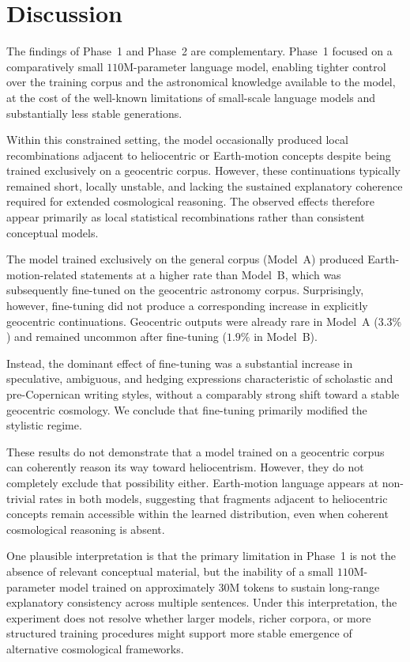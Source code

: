 \section{Discussion}

The findings of Phase~1 and Phase~2 are complementary. Phase~1 focused on a comparatively small $110$M-parameter language model, enabling tighter control over the training corpus and the astronomical knowledge available to the model, at the cost of the well-known limitations of small-scale language models and substantially less stable generations.

Within this constrained setting, the model occasionally produced local recombinations adjacent to heliocentric or Earth-motion concepts despite being trained exclusively on a geocentric corpus. However, these continuations typically remained short, locally unstable, and lacking the sustained explanatory coherence required for extended cosmological reasoning. The observed effects therefore appear primarily as local statistical recombinations rather than consistent conceptual models. 


The model trained exclusively on the general corpus (Model~A) produced Earth-motion-related statements at a higher rate than Model~B, which was subsequently fine-tuned on the geocentric astronomy corpus. Surprisingly, however, fine-tuning did not produce a corresponding increase in explicitly geocentric continuations. Geocentric outputs were already rare in Model~A ($3.3\%$) and remained uncommon after fine-tuning ($1.9\%$ in Model~B).

Instead, the dominant effect of fine-tuning was a substantial increase in speculative, ambiguous, and hedging expressions characteristic of scholastic and pre-Copernican writing styles, without a comparably strong shift toward a stable geocentric cosmology. We conclude that fine-tuning primarily modified the stylistic regime.

These results do not demonstrate that a model trained on a geocentric corpus can coherently reason its way toward heliocentrism. However, they do not completely exclude that possibility either. Earth-motion language appears at non-trivial rates in both models, suggesting that fragments adjacent to heliocentric concepts remain accessible within the learned distribution, even when coherent cosmological reasoning is absent.

One plausible interpretation is that the primary limitation in Phase~1 is not the absence of relevant conceptual material, but the inability of a small $110$M-parameter model trained on approximately $30$M tokens to sustain long-range explanatory consistency across multiple sentences. Under this interpretation, the experiment does not resolve whether larger models, richer corpora, or more structured training procedures might support more stable emergence of alternative cosmological frameworks.


